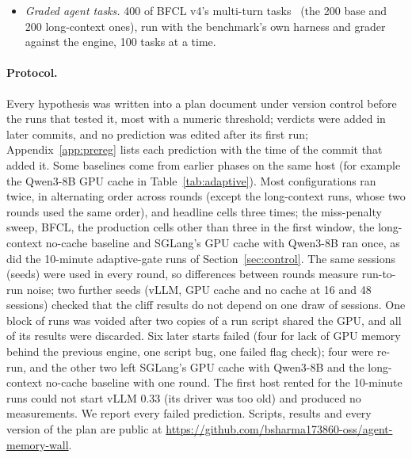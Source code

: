 \begin{itemize}
at the recorded times, with the recorded output lengths (requests longer than the model's 40,960-token context,
29 of 1,392 in the first window at 1/4, were skipped), over two 15-minute windows of the hour (minutes 0--15 and
30--45). Requests still running 240\,s after a window ended were counted as unfinished. In the second window
the 1/4 sample ran right after the 1/8 sample, which it contains, on the same engine, so it began with a warm cache.
\item \emph{Graded agent tasks.} 400 of BFCL v4's multi-turn tasks~\cite{bfcl2025} (the 200 base and 200 long-context ones),
run with the benchmark's own harness and grader against the engine, 100 tasks at a time.
\end{itemize}

\paragraph{Protocol.} Every hypothesis was written into a plan document under version control before the runs that
tested it, most with a numeric threshold; verdicts were added in later commits, and no prediction was edited after its first run;
Appendix~\ref{app:prereg} lists each prediction with the time of the commit that added it. Some baselines come from earlier phases on the same host (for example the Qwen3-8B GPU cache in Table~\ref{tab:adaptive}). Most
configurations ran twice, in alternating order across rounds (except the long-context runs, whose two rounds used the
same order), and headline cells three times; the miss-penalty sweep, BFCL,
the production cells other than three in the first window, the long-context no-cache baseline and SGLang's GPU cache
with Qwen3-8B ran once, as did the 10-minute adaptive-gate runs of Section~\ref{sec:control}. The same
sessions (seeds) were used in every round, so differences between rounds measure run-to-run noise; two further seeds
(vLLM, GPU cache and no cache at 16 and 48 sessions) checked that the cliff results do not depend on one draw of sessions. One block of runs was voided after two copies
of a run script shared the GPU, and all of its results were discarded. Six later starts failed (four for lack of GPU memory
behind the previous engine, one script bug, one failed flag check); four were re-run, and the other two left SGLang's GPU cache with Qwen3-8B and the long-context no-cache baseline
with one round. The first host rented for the 10-minute runs could not start vLLM 0.33 (its driver was too
old) and produced no measurements. We report every failed prediction. Scripts, results and every version of the plan are public at
\url{https://github.com/bsharma173860-oss/agent-memory-wall}.
